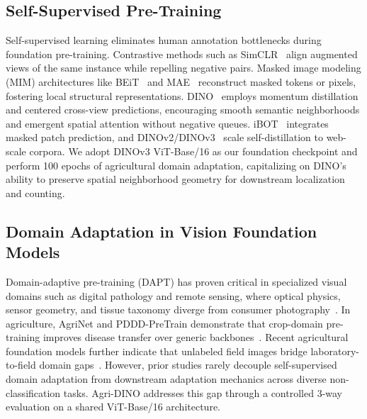 \documentclass[10pt,twocolumn,letterpaper]{article}
\begin{document}
\subsection{Self-Supervised Pre-Training}
Self-supervised learning eliminates human annotation bottlenecks during foundation pre-training. Contrastive methods such as SimCLR~\cite{chen2020simple} align augmented views of the same instance while repelling negative pairs. Masked image modeling (MIM) architectures like BEiT~\cite{bao2022beit} and MAE~\cite{he2022masked} reconstruct masked tokens or pixels, fostering local structural representations. DINO~\cite{caron2021emerging} employs momentum distillation and centered cross-view predictions, encouraging smooth semantic neighborhoods and emergent spatial attention without negative queues. iBOT~\cite{zhou2022ibot} integrates masked patch prediction, and DINOv2/DINOv3~\cite{oquab2024dinov2,simeoni2025dinov3} scale self-distillation to web-scale corpora. We adopt DINOv3 ViT-Base/16 as our foundation checkpoint and perform 100 epochs of agricultural domain adaptation, capitalizing on DINO's ability to preserve spatial neighborhood geometry for downstream localization and counting.

\subsection{Domain Adaptation in Vision Foundation Models}
Domain-adaptive pre-training (DAPT) has proven critical in specialized visual domains such as digital pathology and remote sensing, where optical physics, sensor geometry, and tissue taxonomy diverge from consumer photography~\cite{kang2023pathology,peng2022domain}. In agriculture, AgriNet and PDDD-PreTrain demonstrate that crop-domain pre-training improves disease transfer over generic backbones~\cite{sahili2022agrinet,dong2023pddd}. Recent agricultural foundation models further indicate that unlabeled field images bridge laboratory-to-field domain gaps~\cite{wu2023field,nahian2025agrifm}. However, prior studies rarely decouple self-supervised domain adaptation from downstream adaptation mechanics across diverse non-classification tasks. Agri-DINO addresses this gap through a controlled 3-way evaluation on a shared ViT-Base/16 architecture.
\end{document}

